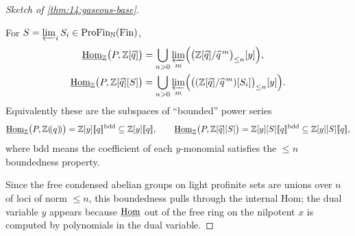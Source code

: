 \begin{proof}[Sketch of \cref{thm:14:gaseous-base}]
\begin{lemma}
\label{lem:14:hom-P}
For $S=\varprojlim_i S_i\in\mathrm{ProFin}_{\mathbb{N}}(\mathrm{Fin})$,
\begin{equation*}
\begin{aligned}
\underline{\operatorname{Hom}}_{\mathbb{Z}}\bigl(P,\mathbb{Z}[\widehat{q}]\bigr)
&=\bigcup_{n>0}\varprojlim_m
\Bigl(\bigl(\mathbb{Z}[\widehat q]/\widehat q^{\,m}\bigr)_{\le n}[y]\Bigr),\\
\underline{\operatorname{Hom}}_{\mathbb{Z}}\bigl(P,\mathbb{Z}[\widehat q][S]\bigr)
&=\bigcup_{n>0}\varprojlim_m
\Bigl(\bigl((\mathbb{Z}[\widehat q]/\widehat q^{\,m})[S_i]\bigr)_{\le n}[y]\Bigr).
\end{aligned}
\end{equation*}
Equivalently these are the subspaces of ``bounded'' power series
\begin{equation}
\label{eq:14:hom-P-bdd}
\iHom_{\mathbb{Z}}\bigl(P,\mathbb{Z}(\!(q)\!)\bigr)=\mathbb{Z}[y][\![q]\!]^{\mathrm{bdd}}\subseteq\mathbb{Z}[y][\![q]\!],\qquad
\iHom_{\mathbb{Z}}\bigl(P,\mathbb{Z}[\widehat q][S]\bigr)=\mathbb{Z}[y][S][\![q]\!]^{\mathrm{bdd}}\subseteq\mathbb{Z}[y][S][\![q]\!],
\end{equation}
where $\mathrm{bdd}$ means the coefficient of each $y$-monomial satisfies the
$\le n$ boundedness property.
\end{lemma}

Since the free condensed abelian groups on light profinite sets are unions over $n$
of loci of norm $\le n$, this boundedness pulls through the internal Hom; the dual
variable $y$ appears because $\underline{\operatorname{Hom}}$ out of the free ring on the nilpotent $x$ is
computed by polynomials in the dual variable.


\end{proof}
